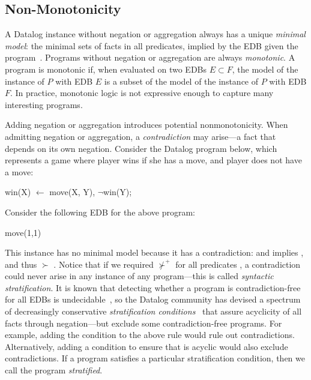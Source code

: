 \subsection{Non-Monotonicity}

A Datalog instance without negation or aggregation always has a unique {\em
minimal model}: the minimal sets of facts in all predicates, implied by the
EDB given the program~\cite{ullmanbook}.  Programs without negation or
aggregation are always {\em monotonic}.  A program is monotonic if, when
evaluated on two EDBs $E \subset F$, the model of the instance of $P$ with EDB
$E$ is a subset of the model of the instance of $P$ with EDB $F$.  In practice,
monotonic logic is not expressive enough to capture many interesting programs.

Adding negation or aggregation introduces potential nonmonotonicity.  When
admitting negation or aggregation, a {\em
contradiction} may arise---a fact that depends on its own negation.  Consider
the Datalog program below, which represents a game where player 
wins if she has a move, and player  does not have a move:

\begin{Dedalus}
win(X) \(\leftarrow\) move(X, Y), \(\lnot\)win(Y);
\end{Dedalus}

\noindent{}Consider the following EDB for the above program:

\begin{Dedalus}
move(1,1)
\end{Dedalus}

\noindent{}This instance has no minimal model because it has a contradiction:
 and  implies ,
and thus  $\succ$ .  Notice that if
we required  $\not\succ^+$  for all predicates
, a contradiction could never arise in any instance of any program---this
is called {\em syntactic stratification}.  It is known that detecting
whether a program is contradiction-free for all EDBs is
undecidable~\cite{papa-yanna}, so the Datalog community has devised a spectrum
of decreasingly conservative {\em stratification conditions}~\cite{local-strat,
ross-syntactic, modular, weak-strat} that assure acyclicity of all facts
through negation---but exclude some contradiction-free programs. For example,
adding the condition  to the above rule would rule out
contradictions.  Alternatively, adding a condition to ensure that
 is acyclic would also exclude contradictions.  If a program
satisfies a particular stratification condition, then we call the program {\em
stratified}.

